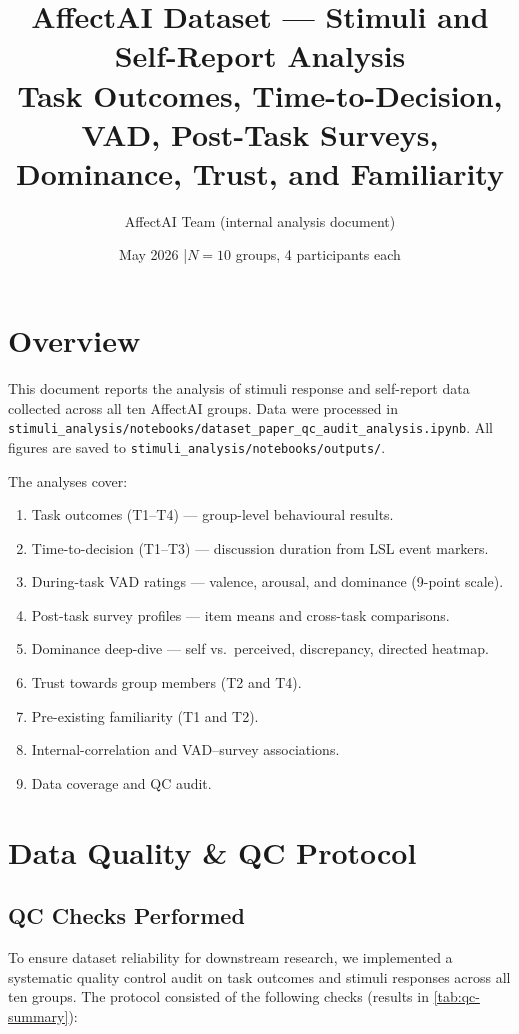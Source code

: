 \documentclass[11pt,a4paper]{article}
\title{%
  AffectAI Dataset — Stimuli and Self-Report Analysis\\[4pt]
  \large Task Outcomes, Time-to-Decision, VAD, Post-Task Surveys,
         Dominance, Trust, and Familiarity
}
\author{AffectAI Team (internal analysis document)}
\date{May 2026 \quad|\quad $N = 10$ groups, 4 participants each}
\begin{document}
\maketitle
\tableofcontents
\clearpage

\section{Overview}
\label{sec:overview}

This document reports the analysis of stimuli response and self-report data
collected across all ten AffectAI groups.
Data were processed in
\texttt{stimuli\_analysis/notebooks/dataset\_paper\_qc\_audit\_analysis.ipynb}.
All figures are saved to \texttt{stimuli\_analysis/notebooks/outputs/}.

The analyses cover:
\begin{enumerate}
  \item Task outcomes (T1–T4) — group-level behavioural results.
  \item Time-to-decision (T1–T3) — discussion duration from LSL event markers.
  \item During-task VAD ratings — valence, arousal, and dominance (9-point scale).
  \item Post-task survey profiles — item means and cross-task comparisons.
  \item Dominance deep-dive — self vs.\ perceived, discrepancy, directed heatmap.
  \item Trust towards group members (T2 and T4).
  \item Pre-existing familiarity (T1 and T2).
  \item Internal-correlation and VAD–survey associations.
  \item Data coverage and QC audit.
\end{enumerate}

\section{Data Quality \& QC Protocol}
\label{sec:qc}

\subsection{QC Checks Performed}

To ensure dataset reliability for downstream research, we implemented
a systematic quality control audit on task outcomes and stimuli responses
across all ten groups. The protocol consisted of the following checks
(results in \cref{tab:qc-summary}):
\end{document}
